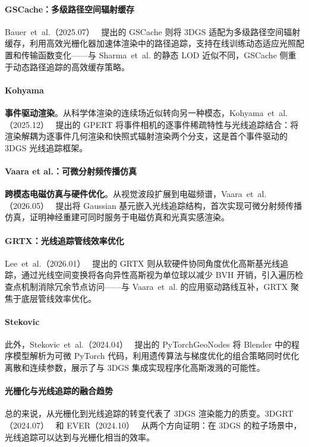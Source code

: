 \paragraph{GSCache：多级路径空间辐射缓存}
Bauer~et~al.（2025.07）~\cite{2507_19718} 提出的 GSCache 则将 3DGS 适配为多级路径空间辐射缓存，利用高效光栅化器加速体渲染中的路径追踪，支持在线训练动态适应光照配置和传输函数变化——与 Sharma~et~al. 的静态 LOD 近似不同，GSCache 侧重于动态路径追踪的高效缓存策略。

\paragraph{Kohyama}
\textbf{事件驱动渲染}。从科学体渲染的连续场近似转向另一种模态，Kohyama~et~al.（2025.12）~\cite{2512_18640} 提出的 GPERT 将事件相机的逐事件稀疏特性与光线追踪结合：将渲染解耦为逐事件几何渲染和快照式辐射渲染两个分支，这是首个事件驱动的 3DGS 光线追踪框架。

\paragraph{Vaara et al.：可微分射频传播仿真}
\textbf{跨模态电磁仿真与硬件优化}。从视觉波段扩展到电磁频谱，Vaara~et~al.（2026.05）~\cite{2605_07781} 提出将 Gaussian 基元嵌入光线追踪结构，首次实现可微分射频传播仿真，证明神经重建可同时服务于电磁仿真和光真实感渲染。

\paragraph{GRTX：光线追踪管线效率优化}
Lee~et~al.（2026.01）~\cite{2601_20429} 提出的 GRTX 则从软硬件协同角度优化高斯基光线追踪，通过光线空间变换将各向异性高斯视为单位球以减少 BVH 开销，引入遍历检查点机制消除冗余节点访问——与 Vaara~et~al. 的应用驱动路线互补，GRTX 聚焦于底层管线效率优化。

\paragraph{Stekovic}
此外，Stekovic~et~al.（2024.04）~\cite{2404_10620} 提出的 PyTorchGeoNodes 将 Blender 中的程序模型解析为可微 PyTorch 代码，利用遗传算法与梯度优化的组合策略同时优化离散和连续参数，展示了与 3DGS 集成实现程序化高斯泼溅的可能性。

\paragraph{光栅化与光线追踪的融合趋势}
总的来说，从光栅化到光线追踪的转变代表了 3DGS 渲染能力的质变。3DGRT（2024.07）~\cite{2407_07090} 和 EVER（2024.10）~\cite{2410_01804} 从两个方向证明：在 3DGS 的粒子场景中，光线追踪可以达到与光栅化相当的效率。

